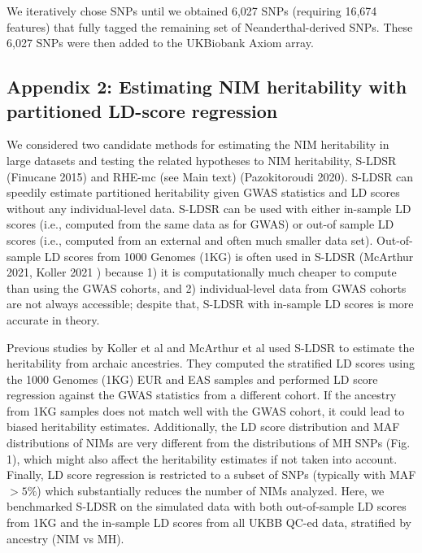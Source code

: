 We iteratively chose SNPs until we obtained 6,027 SNPs (requiring 16,674 features) that fully tagged the remaining set of Neanderthal-derived SNPs. These 6,027 SNPs were then added to the UKBiobank Axiom array.

\subsection{Appendix 2: Estimating NIM heritability with partitioned LD-score regression}
We considered two candidate methods for estimating the NIM heritability in large datasets and testing the related hypotheses to NIM heritability, S-LDSR (Finucane 2015) and RHE-mc (see Main text) (Pazokitoroudi 2020). S-LDSR can speedily estimate partitioned heritability given GWAS statistics and LD scores without any individual-level data. S-LDSR can be used with either in-sample LD scores (i.e., computed from the same data as for GWAS) or out-of sample LD scores (i.e., computed from an external and often much smaller data set). Out-of-sample LD scores from 1000 Genomes (1KG) is often used in S-LDSR (McArthur 2021, Koller 2021 ) because 1) it is computationally much cheaper to compute than using the GWAS cohorts, and 2) individual-level data from GWAS cohorts are not always accessible; despite that, S-LDSR with in-sample LD scores is more accurate in theory. 

Previous studies by Koller et al and McArthur et al used S-LDSR to estimate the heritability from archaic ancestries. They computed the stratified LD scores using the 1000 Genomes (1KG) EUR and EAS samples and performed LD score regression against the GWAS statistics from a different cohort. If the ancestry from 1KG samples does not match well with the GWAS cohort, it could lead to biased heritability estimates. Additionally, the LD score distribution and MAF distributions of NIMs are very different from the distributions of MH SNPs (Fig. 1), which might also affect the heritability estimates if not taken into account. Finally, LD score regression is restricted to a subset of SNPs (typically with MAF $> 5\%$) which substantially reduces the number of NIMs analyzed. Here, we benchmarked S-LDSR on the simulated data with both out-of-sample LD scores from 1KG and the in-sample LD scores from all UKBB QC-ed data, stratified by ancestry (NIM vs MH). 


